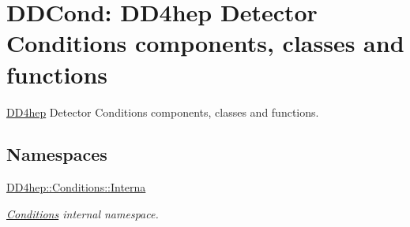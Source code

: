 \hypertarget{group___d_d4_h_e_p___c_o_n_d_i_t_i_o_n_s}{}\section{D\+D\+Cond\+: D\+D4hep Detector Conditions components, classes and functions}
\label{group___d_d4_h_e_p___c_o_n_d_i_t_i_o_n_s}


\hyperlink{namespace_d_d4hep}{D\+D4hep} Detector Conditions components, classes and functions.  


\subsection*{Namespaces}
\begin{DoxyCompactItemize}
\item 
 \hyperlink{namespace_d_d4hep_1_1_conditions_1_1_interna}{D\+D4hep\+::\+Conditions\+::\+Interna}
\begin{DoxyCompactList}\small\item\em \hyperlink{namespace_d_d4hep_1_1_conditions}{Conditions} internal namespace. \end{DoxyCompactList}\end{DoxyCompactItemize}
